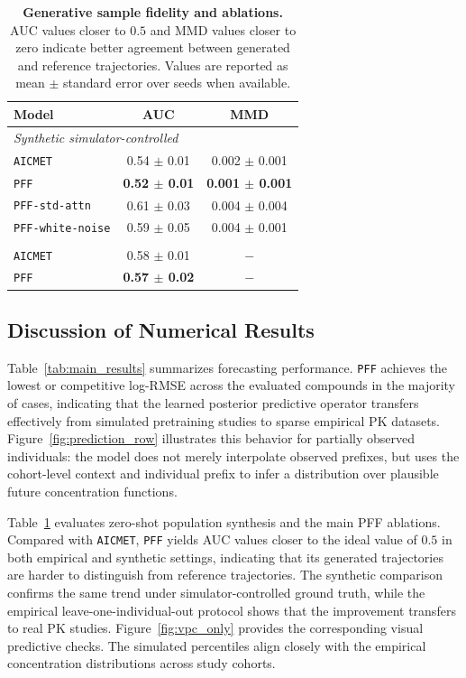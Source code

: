 \begin{table}[t]
\centering
\caption{\textbf{Generative sample fidelity and ablations.}
AUC values closer to $0.5$ and MMD values closer to zero indicate better agreement between generated and reference trajectories. Values are reported as mean $\pm$ standard error over seeds when available.}
\label{tab:sample_fidelity_ablation}
\smaller
\begin{tabular}{lcc}
\toprule
\textbf{Model} & \textbf{AUC} & \textbf{MMD} \\
\midrule
\multicolumn{3}{l}{\textit{Synthetic simulator-controlled}} \\
\texttt{AICMET} & 0.54 $\pm$ 0.01 & 0.002 $\pm$ 0.001 \\
\texttt{PFF} & \textbf{0.52 $\pm$ 0.01} & \textbf{0.001 $\pm$ 0.001} \\
\texttt{PFF-std-attn} & 0.61 $\pm$ 0.03 & 0.004 $\pm$ 0.004 \\
\texttt{PFF-white-noise} & 0.59 $\pm$ 0.05 & 0.004 $\pm$ 0.001 \\
\addlinespace
\multicolumn{3}{l}{\textit{Empirical leave-one-individual-out}} \\
\texttt{AICMET} & 0.58 $\pm$ 0.01& $-$ \\
\texttt{PFF} & \textbf{0.57 $\pm$ 0.02} & $-$ \\
\bottomrule
\end{tabular}
\end{table}

\subsection{Discussion of Numerical Results}
\label{sec:numerical_results}

Table~\ref{tab:main_results} summarizes forecasting performance.
%
\texttt{PFF} achieves the lowest or competitive log-RMSE across the evaluated compounds in the majority of cases, indicating that the learned posterior predictive operator transfers effectively from simulated pretraining studies to sparse empirical PK datasets.
%
Figure~\ref{fig:prediction_row} illustrates this behavior for partially observed individuals: the model does not merely interpolate observed prefixes, but uses the cohort-level context and individual prefix to infer a distribution over plausible future concentration functions.

Table~\ref{tab:sample_fidelity_ablation} evaluates zero-shot population synthesis and the main PFF ablations.
%
Compared with \texttt{AICMET}, \texttt{PFF} yields AUC values closer to the ideal value of $0.5$ in both empirical and synthetic settings, indicating that its generated trajectories are harder to distinguish from reference trajectories.
%
The synthetic comparison confirms the same trend under simulator-controlled ground truth, while the empirical leave-one-individual-out protocol shows that the improvement transfers to real PK studies.
%
Figure~\ref{fig:vpc_only} provides the corresponding visual predictive checks. The simulated percentiles align closely with the empirical concentration distributions across study cohorts.

